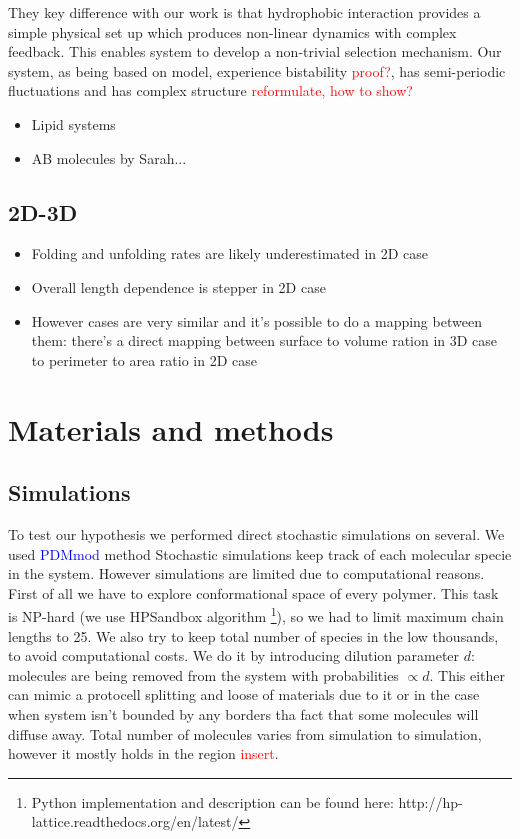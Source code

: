 \documentclass[journal=jacsat,manuscript=article,layout=twocolumn]{achemso}
\newcommand*{\red}[1]{\textcolor{red}{#1}}
\newcommand*{\blue}[1]{\textcolor{blue}{#1}}
\begin{document}
They key difference with our work is 
that hydrophobic interaction provides a simple physical set up which produces non-linear dynamics with complex feedback.
This enables system to develop a non-trivial selection mechanism. Our system, as being based on 
\cite{Ohtsuki2009} model, experience bistability \red{proof?}, has semi-periodic fluctuations  and 
has complex structure \red{reformulate, how to show?}
\begin{itemize}
 \item Lipid systems
 \item AB molecules by Sarah...
\end{itemize}



\subsection{2D-3D}
\begin{itemize}
 \item Folding and unfolding rates are likely underestimated in 2D case
 \item Overall length dependence is stepper in 2D case
 \item However cases are very similar and it's possible to do a mapping between them: there's a 
direct mapping between surface to volume ration in 3D case to perimeter to area ratio in 2D case
\end{itemize}


\section{Materials and methods}\label{sec:mat}
\subsection{Simulations}\label{sec:mat-sim}
To test our hypothesis we performed direct stochastic simulations on several. We used 
\blue{PDMmod} method \cite{Bernatskiy}
Stochastic simulations keep track of each 
molecular specie in the system. However simulations are limited due to computational reasons. 
First 
of all we have to explore conformational space of every polymer. This task is NP-hard (we use 
HPSandbox algorithm\cite{lau1989lattice,Dill2008} \footnote{Python implementation and description 
can be found here: http://hp-lattice.readthedocs.org/en/latest/}), so we had to limit 
maximum chain lengths to 25. We also try to keep total number of species in the low thousands, to 
avoid computational costs. We do it by introducing dilution parameter $d$: molecules are being 
removed from the system with probabilities $\propto d$. 
This either can mimic a protocell splitting and loose of materials due to it or in the case when 
system isn't bounded by any borders tha fact that some molecules will diffuse away. Total number of 
molecules varies from simulation to simulation, 
however it mostly holds in the region \red{insert}.
\end{document}
